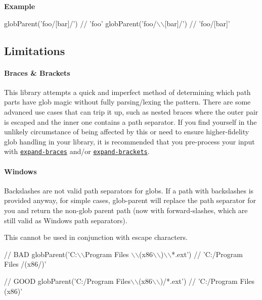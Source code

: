{\bfseries Example}


\begin{DoxyCode}
globParent('foo/[bar]/') // 'foo'
globParent('foo/\(\backslash\)\(\backslash\)[bar]/') // 'foo/[bar]'
\end{DoxyCode}


\subsection*{Limitations}

\paragraph*{Braces \& Brackets}

This library attempts a quick and imperfect method of determining which path parts have glob magic without fully parsing/lexing the pattern. There are some advanced use cases that can trip it up, such as nested braces where the outer pair is escaped and the inner one contains a path separator. If you find yourself in the unlikely circumstance of being affected by this or need to ensure higher-\/fidelity glob handling in your library, it is recommended that you pre-\/process your input with \href{https://github.com/jonschlinkert/expand-braces}{\tt expand-\/braces} and/or \href{https://github.com/jonschlinkert/expand-brackets}{\tt expand-\/brackets}.

\paragraph*{Windows}

Backslashes are not valid path separators for globs. If a path with backslashes is provided anyway, for simple cases, glob-\/parent will replace the path separator for you and return the non-\/glob parent path (now with forward-\/slashes, which are still valid as Windows path separators).

This cannot be used in conjunction with escape characters.


\begin{DoxyCode}
// BAD
globParent('C:\(\backslash\)\(\backslash\)Program Files \(\backslash\)\(\backslash\)(x86\(\backslash\)\(\backslash\))\(\backslash\)\(\backslash\)*.ext') // 'C:/Program Files /(x86/)'

// GOOD
globParent('C:/Program Files\(\backslash\)\(\backslash\)(x86\(\backslash\)\(\backslash\))/*.ext') // 'C:/Program Files (x86)'
\end{DoxyCode}


